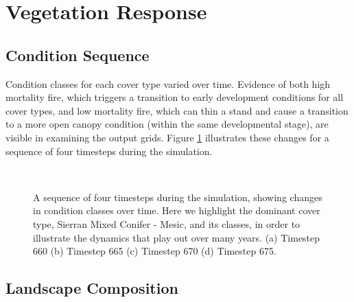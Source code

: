 \clearpage



\section{Vegetation Response}
\label{subsec:HRVvegresponse}

\subsection{Condition Sequence}

Condition classes for each cover type varied over time. Evidence of both high mortality fire, which triggers a transition to early development conditions for all cover types, and low mortality fire, which can thin a stand and cause a transition to a more open canopy condition (within the same developmental stage), are visible in examining the output grids. Figure \ref{fig:covcondmaps} illustrates these changes for a sequence of four timesteps during the simulation.

\begin{figure}[!htbp]
  \centering
  \\%
  \caption{A sequence of four timesteps during the simulation, showing changes in condition classes over time. Here we highlight the dominant cover type, Sierran Mixed Conifer - Mesic, and its classes, in order to illustrate the dynamics that play out over many years. (a) Timestep 660 (b) Timestep 665 (c) Timestep 670 (d) Timestep 675.}
  \label{fig:covcondmaps}
\end{figure}




\subsection{Landscape Composition} 

